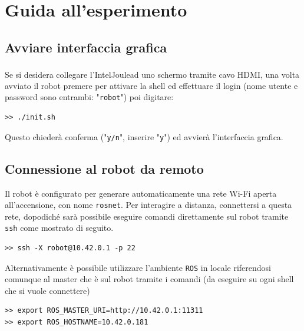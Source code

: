 

\chapter{Guida all'esperimento}
\label{appendice3}
\section*{Avviare interfaccia grafica}

Se si desidera collegare l’Intel\textsuperscript\textregistered Joule\texttrademark\hspace{1mm}ad uno schermo tramite cavo HDMI, una volta avviato il robot premere  per attivare la shell ed effettuare il login (nome utente e password sono entrambi: "\verb!robot!") poi digitare:

\medskip
\begin{tcolorbox}
\begin{verbatim}
>> ./init.sh
\end{verbatim}
\end{tcolorbox}

Questo chiederà conferma ("\verb!y/n!", inserire "\verb!y!") ed avvierà l'interfaccia grafica.
\section*{Connessione al robot da remoto}
Il robot è configurato per generare automaticamente una rete Wi-Fi aperta all'accensione, con nome \verb!rosnet!. Per interagire a distanza, connettersi a questa rete, dopodiché sarà possibile eseguire comandi direttamente sul robot tramite \verb!ssh! come mostrato di seguito.

\medskip
\begin{tcolorbox}
\begin{verbatim}
>> ssh -X robot@10.42.0.1 -p 22
\end{verbatim}
\end{tcolorbox}

Alternativamente è possibile utilizzare l’ambiente \verb!ROS! in locale riferendosi comunque al master che è sul robot  tramite i comandi (da eseguire su ogni shell che si vuole connettere)
\medskip
\begin{tcolorbox}
\begin{verbatim}
>> export ROS_MASTER_URI=http://10.42.0.1:11311
>> export ROS_HOSTNAME=10.42.0.181
\end{verbatim}
\end{tcolorbox}

